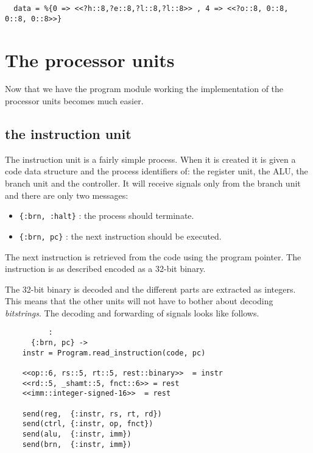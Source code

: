 \documentclass[a4paper,11pt]{article}
\begin{document}
\begin{verbatim}
  data = %{0 => <<?h::8,?e::8,?l::8,?l::8>> , 4 => <<?o::8, 0::8, 0::8, 0::8>>}
\end{verbatim}



\section{The processor units}

Now that we have the program module working the implementation of the
processor units becomes much easier.

\subsection{the instruction unit}

The instruction unit is a fairly simple process. When it is created it
is given a code data structure and the process identifiers of: the
register unit, the ALU, the branch unit and the controller. It will
receive signals only from the branch unit and there are only two messages:

\begin{itemize}
\item {\tt \{:brn, :halt\}} : the process should terminate.
  
\item {\tt \{:brn, pc\}} : the next instruction should be executed.
\end{itemize}

The next instruction is retrieved from the code using the program
pointer. The instruction is as described encoded as a 32-bit binary.

The 32-bit binary is decoded and the different parts are extracted as
integers. This means that the other units will not have to bother
about decoding {\em bitstrings}. The decoding and forwarding of signals
looks like follows.

\begin{verbatim}
          :
      {:brn, pc} ->
	instr = Program.read_instruction(code, pc)

	<<op::6, rs::5, rt::5, rest::binary>>  = instr
	<<rd::5, _shamt::5, fnct::6>> = rest
	<<imm::integer-signed-16>>  = rest

	send(reg,  {:instr, rs, rt, rd})	    
	send(ctrl, {:instr, op, fnct})
	send(alu,  {:instr, imm})
	send(brn,  {:instr, imm})
\end{verbatim}
\end{document}
